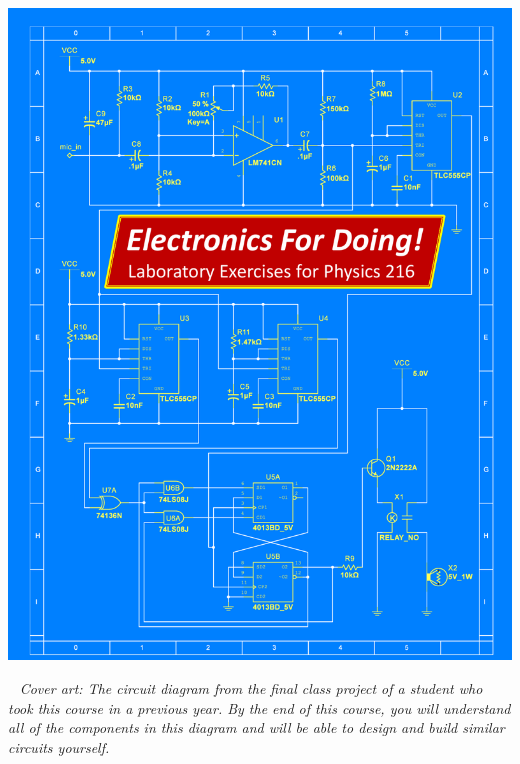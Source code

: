 \thispagestyle{empty}

\begin{center}
\includegraphics[width=8.44in]{electronics_front_pages/electronics_front_cover_kuri.pdf}
\end{center}
\newpage

\restoregeometry
\restorepagecolor
\thispagestyle{empty}

\
\vfill
\textit{Cover art: The circuit diagram from the final class project of a student who took this course in a previous year.  By the end of this course, you will understand all of the components in this diagram and will be able to design and build similar circuits  yourself.}
\pagebreak



